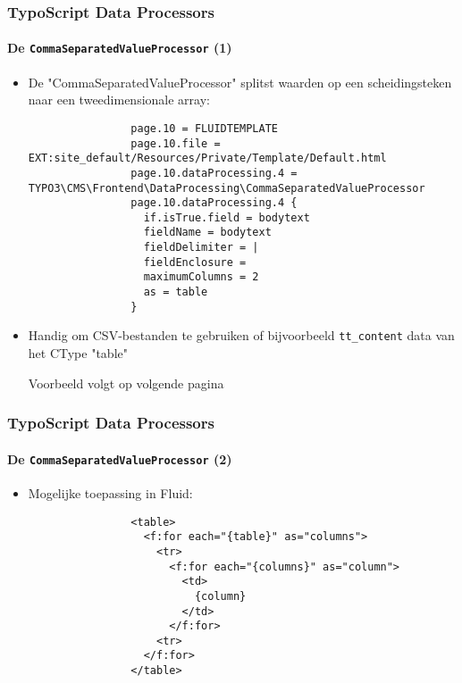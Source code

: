 \begin{frame}[fragile]
	\frametitle{TypoScript Data Processors}
	\framesubtitle{De \texttt{CommaSeparatedValueProcessor} (1)}

	\lstset{basicstyle=\tiny\ttfamily}

	\begin{itemize}

		\item De "CommaSeparatedValueProcessor" splitst waarden op een scheidingsteken naar een tweedimensionale array:

			\begin{lstlisting}
				page.10 = FLUIDTEMPLATE
				page.10.file = EXT:site_default/Resources/Private/Template/Default.html
				page.10.dataProcessing.4 = TYPO3\CMS\Frontend\DataProcessing\CommaSeparatedValueProcessor
				page.10.dataProcessing.4 {
				  if.isTrue.field = bodytext
				  fieldName = bodytext
				  fieldDelimiter = |
				  fieldEnclosure =
				  maximumColumns = 2
				  as = table
				}
			\end{lstlisting}

		\item Handig om CSV-bestanden te gebruiken of bijvoorbeeld \texttt{tt\_content} data van het CType "table"

			\vspace{0.2cm}
			\small
				Voorbeeld volgt op volgende pagina
			\normalsize

	\end{itemize}

\end{frame}


\begin{frame}[fragile]
	\frametitle{TypoScript Data Processors}
	\framesubtitle{De \texttt{CommaSeparatedValueProcessor} (2)}

	\lstset{basicstyle=\tiny\ttfamily}

	\begin{itemize}

		\item Mogelijke toepassing in Fluid:

			\begin{lstlisting}
				<table>
				  <f:for each="{table}" as="columns">
				    <tr>
				      <f:for each="{columns}" as="column">
				        <td>
				          {column}
				        </td>
				      </f:for>
				    <tr>
				  </f:for>
				</table>
			\end{lstlisting}

	\end{itemize}

\end{frame}

